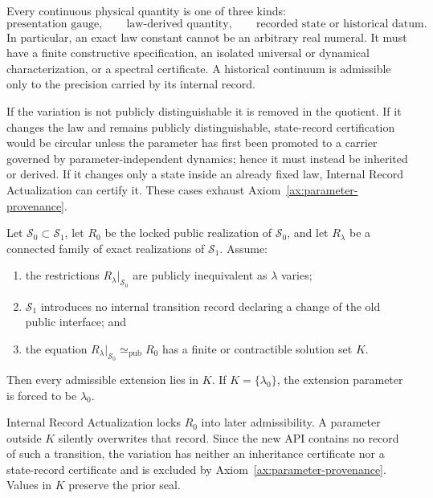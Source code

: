\begin{proposition}
\label{prop:parameter-trichotomy}
Every continuous physical quantity is one of three kinds:
\[
 \text{presentation gauge},
 \qquad
 \text{law-derived quantity},
 \qquad
 \text{recorded state or historical datum}.
\]
In particular, an exact law constant cannot be an arbitrary real numeral.  It must
have a finite constructive specification, an isolated universal or dynamical
characterization, or a spectral certificate.  A historical continuum is admissible
only to the precision carried by its internal record.
\end{proposition}

\begin{proofsketch}
If the variation is not publicly distinguishable it is removed in the quotient.  If
it changes the law and remains publicly distinguishable, state-record certification
would be circular unless the parameter has first been promoted to a carrier governed
by parameter-independent dynamics; hence it must instead be inherited or derived.
If it changes only a state inside an already fixed law, Internal Record Actualization
can certify it.  These cases exhaust Axiom~\ref{ax:parameter-provenance}.
\end{proofsketch}

\begin{theorem}
\label{thm:locked-extension-rigidity}
Let \(\mathcal S_0\subset\mathcal S_1\), let \(R_0\) be the locked public
realization of \(\mathcal S_0\), and let \(R_\lambda\) be a connected family of
exact realizations of \(\mathcal S_1\).  Assume:
\begin{enumerate}[label=\textup{(\roman*)},leftmargin=2.2em]
\item the restrictions \(R_\lambda|_{\mathcal S_0}\) are publicly inequivalent as
      \(\lambda\) varies;
\item \(\mathcal S_1\) introduces no internal transition record declaring a change
      of the old public interface; and
\item the equation
      \(R_\lambda|_{\mathcal S_0}\simeq_{\mathrm{pub}}R_0\) has a finite or
      contractible solution set \(K\).
\end{enumerate}
Then every admissible extension lies in \(K\).  If \(K=\{\lambda_0\}\), the
extension parameter is forced to be \(\lambda_0\).
\end{theorem}

\begin{proofsketch}
Internal Record Actualization locks \(R_0\) into later admissibility.  A parameter
outside \(K\) silently overwrites that record.  Since the new API contains no record
of such a transition, the variation has neither an inheritance certificate nor a
state-record certificate and is excluded by
Axiom~\ref{ax:parameter-provenance}.  Values in \(K\) preserve the prior seal.
\end{proofsketch}

